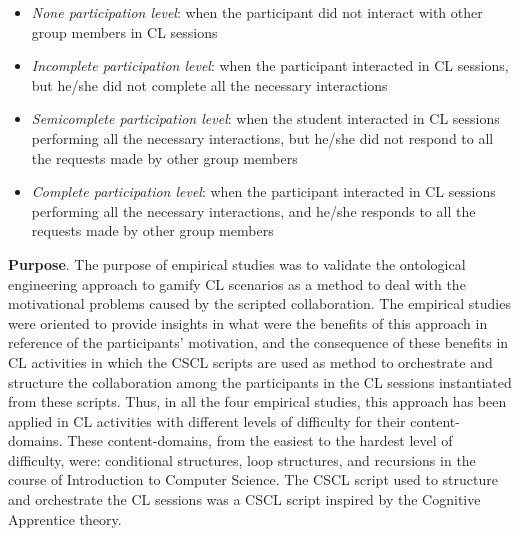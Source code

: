\begin{itemize}
\item \emph{None participation level}: when the participant did not interact with other group members in CL sessions
\item \emph{Incomplete participation level}: when the participant interacted in CL sessions, but he/she did not complete all the necessary interactions
\item \emph{Semicomplete participation level}: when the student interacted in CL sessions performing all the necessary interactions, but he/she did not respond to all the requests made by other group members
\item \emph{Complete participation level}: when the participant interacted in CL sessions performing all the necessary interactions, and he/she responds to all the requests made by other group members
\end{itemize}
 
\textbf{Purpose}. The purpose of empirical studies was to validate the ontological engineering approach to gamify CL scenarios as a method to deal with the motivational problems caused by the scripted collaboration. 
The empirical studies were oriented to provide insights in what were the benefits of this approach in reference of the participants' motivation, and the consequence of these benefits in CL activities in which the CSCL scripts are used as method to orchestrate and structure the collaboration among the participants in the CL sessions instantiated from these scripts. Thus, in all the four empirical studies, this approach has been applied in CL activities with different levels of difficulty for their content-domains. These content-domains, from the easiest to the hardest level of difficulty, were: conditional structures, loop structures, and recursions in the course of Introduction to Computer Science. The CSCL script used to structure and orchestrate the CL sessions was a CSCL script inspired by the Cognitive Apprentice theory.

